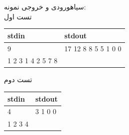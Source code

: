 ‌سیاه{ورودی و خروجی نمونه:}\\

تست اول
\begin{latin}
	\begin{tabularx}{\textwidth}{|X | X|}
		\hline
		\textbf{stdin} &
		\textbf{stdout}\\
		\hline
		9 & 17 12 8 8 5 5 1 0 0\\
		1 2 3 1 4 2 5 7 8 & \\
		\hline
	\end{tabularx}
\end{latin}

تست دوم
\begin{latin}
	\begin{tabularx}{\textwidth}{|X | X|}
		\hline
		\textbf{stdin} &
		\textbf{stdout}\\
		\hline
		4 & 3 1 0 0\\
		1 2 3 4 & \\
		\hline
		
	\end{tabularx}
\end{latin}









